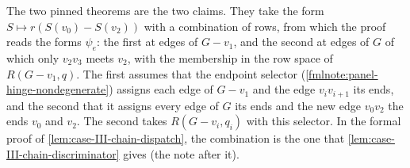 \begin{fmlnote}
  The two pinned theorems are the two claims. They take the form
  $S \mapsto r(S(v_0) - S(v_2))$ with a combination of rows, from which
  the proof reads the forms $\psi_e$: the first at edges of $G - v_1$,
  and the second at edges of $G$ of which only $v_2 v_3$ meets $v_2$,
  with the membership in the row space of $R(G - v_1, q)$. The first
  assumes that the endpoint selector
  (\cref{fmlnote:panel-hinge-nondegenerate}) assigns each edge of
  $G - v_1$ and the edge $v_i v_{i+1}$ its ends, and the second that it
  assigns every edge of $G$ its ends and the new edge $v_0 v_2$ the ends
  $v_0$ and $v_2$. The second takes $R(G - v_i, q_i)$ with this selector.
  In the formal proof of \cref{lem:case-III-chain-dispatch}, the
  combination is the one that
  \cref{lem:case-III-chain-discriminator} gives (the note after it).
\end{fmlnote}

